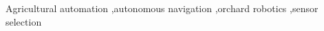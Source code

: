 \documentclass[preprint,authoryear,12pt]{elsarticle}
\begin{document}
\begin{frontmatter}
\begin{abstract}








\end{abstract}

\begin{keyword}

    Agricultural automation \sep autonomous navigation \sep orchard robotics \sep sensor selection
\end{keyword}

\end{frontmatter}
\end{document}
